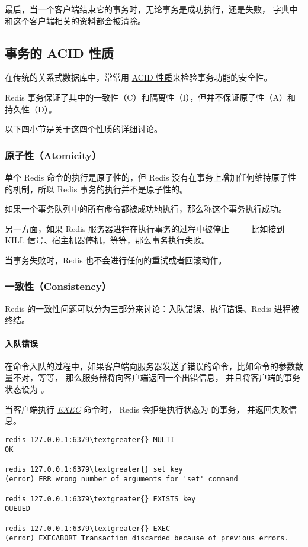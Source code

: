 \documentclass[a4paper,11pt,english]{sphinxmanual}
\begin{document}
最后，当一个客户端结束它的事务时，无论事务是成功执行，还是失败，  字典中和这个客户端相关的资料都会被清除。


\subsection{事务的 ACID 性质}
\label{feature/transaction:acid}
在传统的关系式数据库中，常常用 \href{http://en.wikipedia.org/wiki/ACID}{ACID 性质}来检验事务功能的安全性。

Redis 事务保证了其中的一致性（C）和隔离性（I），但并不保证原子性（A）和持久性（D）。

以下四小节是关于这四个性质的详细讨论。


\subsubsection{原子性（Atomicity）}
\label{feature/transaction:atomicity}
单个 Redis 命令的执行是原子性的，但 Redis 没有在事务上增加任何维持原子性的机制，所以 Redis 事务的执行并不是原子性的。

如果一个事务队列中的所有命令都被成功地执行，那么称这个事务执行成功。

另一方面，如果 Redis 服务器进程在执行事务的过程中被停止 —— 比如接到 KILL 信号、宿主机器停机，等等，那么事务执行失败。

当事务失败时，Redis 也不会进行任何的重试或者回滚动作。


\subsubsection{一致性（Consistency）}
\label{feature/transaction:consistency}
Redis 的一致性问题可以分为三部分来讨论：入队错误、执行错误、Redis 进程被终结。


\paragraph{入队错误}
\label{feature/transaction:id10}
在命令入队的过程中，如果客户端向服务器发送了错误的命令，比如命令的参数数量不对，等等，
那么服务器将向客户端返回一个出错信息，
并且将客户端的事务状态设为  。

当客户端执行 \href{http://redis.readthedocs.org/en/latest/transaction/exec.html\#exec}{\emph{EXEC}} 命令时，
Redis 会拒绝执行状态为  的事务，
并返回失败信息。

\begin{Verbatim}[commandchars=\\\{\}]
redis 127.0.0.1:6379\textgreater{} MULTI
OK

redis 127.0.0.1:6379\textgreater{} set key
(error) ERR wrong number of arguments for 'set' command

redis 127.0.0.1:6379\textgreater{} EXISTS key
QUEUED

redis 127.0.0.1:6379\textgreater{} EXEC
(error) EXECABORT Transaction discarded because of previous errors.
\end{Verbatim}
\end{document}
